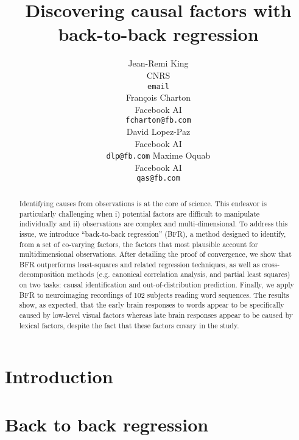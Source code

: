 \documentclass{article}
\title{Discovering causal factors with back-to-back regression}
\author{%
  Jean-Remi King\\
  CNRS\\
  \texttt{email} \\
  \And
  Fran\c{c}ois Charton\\
  Facebook AI\\
  \texttt{fcharton@fb.com}\\
  \And
  David Lopez-Paz\\
  Facebook AI\\
  \texttt{dlp@fb.com}
  \And
  Maxime Oquab\\
  Facebook AI\\
  \texttt{qas@fb.com}
}
\begin{document}
\maketitle

\begin{abstract}
Identifying causes from observations is at the core of science. This endeavor
is particularly challenging when i) potential factors are difficult to
manipulate individually and ii) observations are complex and multi-dimensional.
To address this issue, we introduce ``back-to-back regression'' (BFR), a
method designed to identify, from a set of co-varying factors, the factors
that most plausible account for multidimensional observations. After detailing
the proof of convergence, we show that BFR outperforms least-squares and related
regression techniques, as well as cross-decomposition methods (e.g. canonical
correlation analysis, and partial least squares) on two tasks: causal
identification and out-of-distribution prediction. Finally, we apply BFR to
neuroimaging recordings of 102 subjects reading word sequences. The results
show, as expected, that the early brain responses to words appear to be
specifically caused by low-level visual factors whereas late brain responses
appear to be caused by lexical factors, despite the fact that these factors
covary in the study.
\end{abstract}

\section{Introduction}



\section{Back to back regression}
\end{document}
